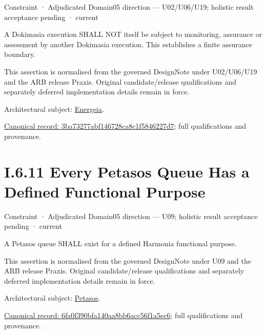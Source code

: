 \label{element:3ba73277abf146728ca8c1f5846227d7}
{\small Constraint · Adjudicated Domain05 direction — U02/U06/U19; holistic result acceptance pending · current}\par

A Dokimasia execution SHALL NOT itself be subject to monitoring, assurance or assessment by another Dokimasia execution. This establishes a finite assurance boundary.



This assertion is normalised from the governed DesignNote under U02/U06/U19 and the ARB release Praxis. Original candidate/release qualifications and separately deferred implementation details remain in force.



Architectural subject: \hyperref[element:fb3f37a6ac614415ac486a6de9d35994]{Energeia}.


{\footnotesize \href{../../../../../../../../continuum/motivation/constraint/3ba73277abf146728ca8c1f5846227d7.md}{Canonical record: 3ba73277abf146728ca8c1f5846227d7}; full qualifications and provenance.}\par
\section*{I.6.11 Every Petasos Queue Has a Defined Functional Purpose}
\label{navigation:I.6.11}

\label{element:6fa0f390bfa140aa8bb6acc56f1a5ec6}
{\small Constraint · Adjudicated Domain05 direction — U09; holistic result acceptance pending · current}\par

A Petasos queue SHALL exist for a defined Harmonia functional purpose.



This assertion is normalised from the governed DesignNote under U09 and the ARB release Praxis. Original candidate/release qualifications and separately deferred implementation details remain in force.



Architectural subject: \hyperref[element:195e5f10db8e419391354197b5d7a8cc]{Petasos}.


{\footnotesize \href{../../../../../../../../continuum/motivation/constraint/6fa0f390bfa140aa8bb6acc56f1a5ec6.md}{Canonical record: 6fa0f390bfa140aa8bb6acc56f1a5ec6}; full qualifications and provenance.}\par
